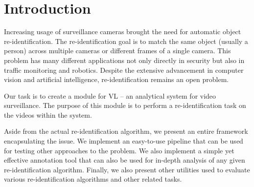 \chapter*{Introduction}

\label{ch:intro}

Increasing usage of surveillance cameras brought the need for automatic object re-identification.  The re-identification goal is to match the same object (usually a person) across multiple cameras or different frames of a single camera. This problem has many different applications not only directly in security but also in traffic monitoring and robotics. Despite the extensive advancement in computer vision and artificial intelligence, re-identification remains an open problem.

Our task is to create a module for \gls{VL} -- an analytical system for video surveillance. The purpose of this module is to perform a re-identification task on the videos within the system.

Aside from the actual re-identification algorithm, we present an entire framework encapsulating the issue. We implement an easy-to-use pipeline that can be used for testing other approaches to the problem. We also implement a simple yet effective annotation tool that can also be used for in-depth analysis of any given re-identification algorithm. Finally, we also present other utilities used to evaluate various re-identification algorithms and other related tasks.

